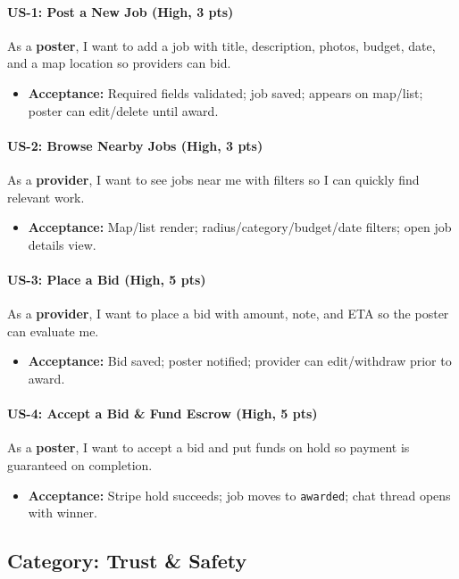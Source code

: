 \documentclass[11pt]{article}
\begin{document}
\paragraph{US-1: Post a New Job (High, 3 pts)}
As a \textbf{poster}, I want to add a job with title, description, photos, budget, date, and a map location so providers can bid.
\begin{itemize}[leftmargin=1.4em]
  \item \textbf{Acceptance:} Required fields validated; job saved; appears on map/list; poster can edit/delete until award.
\end{itemize}

\paragraph{US-2: Browse Nearby Jobs (High, 3 pts)}
As a \textbf{provider}, I want to see jobs near me with filters so I can quickly find relevant work.
\begin{itemize}[leftmargin=1.4em]
  \item \textbf{Acceptance:} Map/list render; radius/category/budget/date filters; open job details view.
\end{itemize}

\paragraph{US-3: Place a Bid (High, 5 pts)}
As a \textbf{provider}, I want to place a bid with amount, note, and ETA so the poster can evaluate me.
\begin{itemize}[leftmargin=1.4em]
  \item \textbf{Acceptance:} Bid saved; poster notified; provider can edit/withdraw prior to award.
\end{itemize}

\paragraph{US-4: Accept a Bid \& Fund Escrow (High, 5 pts)}
As a \textbf{poster}, I want to accept a bid and put funds on hold so payment is guaranteed on completion.
\begin{itemize}[leftmargin=1.4em]
  \item \textbf{Acceptance:} Stripe hold succeeds; job moves to \texttt{awarded}; chat thread opens with winner.
\end{itemize}

\subsection*{Category: Trust \& Safety}
\end{document}
